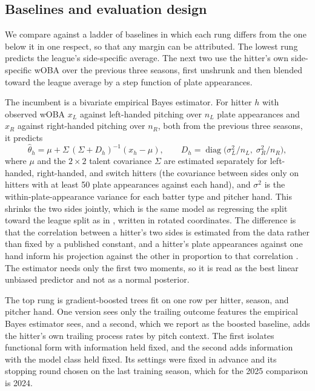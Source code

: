 \documentclass[11pt,letterpaper]{article}
\begin{document}
\subsection{Baselines and evaluation design}
\label{sec:eval}

We compare against a ladder of baselines in which each rung differs from the one below it in one respect, so that any margin can be attributed. The lowest rung predicts the league's side-specific average. The next two use the hitter's own side-specific wOBA over the previous three seasons, first unshrunk and then blended toward the league average by a step function of plate appearances.

The incumbent is a bivariate empirical Bayes estimator. For hitter $h$ with observed wOBA $x_L$ against left-handed pitching over $n_L$ plate appearances and $x_R$ against right-handed pitching over $n_R$, both from the previous three seasons, it predicts
\begin{equation}
\hat\theta_h = \mu + \Sigma\,(\Sigma + D_h)^{-1}(x_h - \mu), \qquad D_h = \operatorname{diag}\!\big(\sigma^2_L/n_L,\; \sigma^2_R/n_R\big),
\label{eq:eb}
\end{equation}
where $\mu$ and the $2\times2$ talent covariance $\Sigma$ are estimated separately for left-handed, right-handed, and switch hitters (the covariance between sides only on hitters with at least 50 plate appearances against each hand), and $\sigma^2$ is the within-plate-appearance variance for each batter type and pitcher hand. This shrinks the two sides jointly, which is the same model as regressing the split toward the league split as in \citet{tango2007}, written in rotated coordinates. The difference is that the correlation between a hitter's two sides is estimated from the data rather than fixed by a published constant, and a hitter's plate appearances against one hand inform his projection against the other in proportion to that correlation \citep{efron1972}. The estimator needs only the first two moments, so it is read as the best linear unbiased predictor and not as a normal posterior.

The top rung is gradient-boosted trees \citep{chen2016} fit on one row per hitter, season, and pitcher hand. One version sees only the trailing outcome features the empirical Bayes estimator sees, and a second, which we report as the boosted baseline, adds the hitter's own trailing process rates by pitch context. The first isolates functional form with information held fixed, and the second adds information with the model class held fixed. Its settings were fixed in advance and its stopping round chosen on the last training season, which for the 2025 comparison is 2024.
\end{document}
